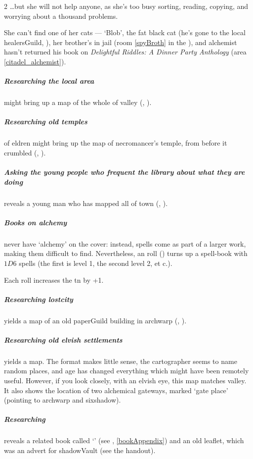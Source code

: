 \begin{multicols}{2}
\ldots but she will not help anyone, as she's too busy sorting, reading, copying, and worrying about a thousand problems.


She can't find one of her cats --- `Blob', the fat black cat (he's gone to the local \gls{healersGuild}, ),
her brother's in jail (room  \vref{spyBroth} in the ), and \gls{alchemist} hasn't returned his book on \textit{Delightful Riddles: A Dinner Party Anthology} (\gls{area} \vref{citadel_alchemist}).
\label{paperCat}

\medbreak

\subparagraph{Researching the local area}
might bring up a map of the whole of \gls{valley} (, \tn[14]).

\subparagraph{Researching old temples}
of \gls{eldren} might bring up the map of \gls{necromancer}'s temple, from before it crumbled (, \tn[10]).

\subparagraph{Asking the young people who frequent the library about what they are doing}
reveals a young man who has mapped all of \gls{town} (, \tn[10]).

\subparagraph{Books on \gls{alchemy}}
never have `\gls{alchemy}' on the cover: instead, \glspl{spell} come as part of a larger work, making them difficult to find.
Nevertheless, an  roll (\tn[9]) turns up a spell-book with $1D6$ spells (the first is level 1, the second level 2, et c.).

Each roll increases the \gls{tn} by +1.

\subparagraph{Researching \gls{lostcity}}
yields a map of an old \gls{paperGuild} building in \gls{archwarp} (, \tn[18]).

\subparagraph{Researching old elvish settlements}
yields a map.
The format makes little sense, the cartographer seems to name random places, and age has changed everything which might have been remotely useful.
However, if you look closely, with an elvish eye, this map matches \gls{valley}.
It also shows the location of two alchemical gateways, marked `gate place' (pointing to \gls{archwarp} and \gls{sixshadow}).

\subparagraph{Researching }
reveals a related book called `' (see , \autoref{bookAppendix}) and an old leaflet, which was an advert for \gls{shadowVault} (see the handout).
\label{fingers:greyLibrary}


\end{multicols}
